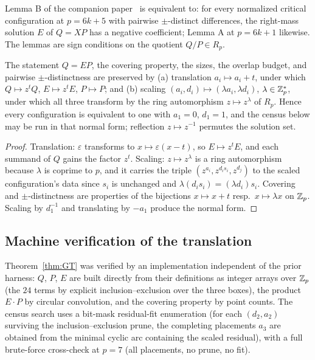\begin{corollary}\label{cor:signform}
Lemma B of the companion paper~\cite{companion-paper} is equivalent to: for every normalized
critical configuration at $p=6k+5$ with pairwise $\pm$-distinct differences,
the right-mass solution $E$ of $Q=XP$ has a negative coefficient; Lemma A at
$p=6k+1$ likewise. The lemmas are sign conditions on the quotient
$Q/P\in R_p$.
\end{corollary}

\begin{proposition}\label{prop:normalform}
The statement $Q=EP$, the covering property, the sizes, the overlap budget,
and pairwise $\pm$-distinctness are preserved by \textup{(a)} translation
$a_i\mapsto a_i+t$, under which $Q\mapsto z^{t}Q$, $E\mapsto z^{t}E$,
$P\mapsto P$; and \textup{(b)} scaling $(a_i,d_i)\mapsto(\lambda a_i,
\lambda d_i)$, $\lambda\in\mathbb{Z}_p^{*}$, under which all three transform by the
ring automorphism $z\mapsto z^{\lambda}$ of $R_p$. Hence every configuration
is equivalent to one with $a_1=0$, $d_1=1$, and the census below may be run
in that normal form; reflection $z\mapsto z^{-1}$ permutes the solution set.
\end{proposition}

\begin{proof}
Translation: $\varepsilon$ transforms to $x\mapsto\varepsilon(x-t)$, so
$E\mapsto z^tE$, and each summand of $Q$ gains the factor $z^t$. Scaling:
$z\mapsto z^\lambda$ is a ring automorphism because $\lambda$ is coprime to
$p$, and it carries the triple $(z^{a_i},z^{d_is_i},z^{d_j})$ to the scaled
configuration's data since $s_i$ is unchanged and
$\lambda(d_is_i)=(\lambda d_i)s_i$. Covering and $\pm$-distinctness are
properties of the bijections $x\mapsto x+t$ resp.\ $x\mapsto\lambda x$ on
$\mathbb{Z}_p$. Scaling by $d_1^{-1}$ and translating by $-a_1$ produce the normal
form.
\end{proof}

\subsection{Machine verification of the translation}\label{sec:gt-verify}

Theorem~\ref{thm:GT} was verified by an implementation independent of the
prior harness: $Q$, $P$, $E$ are built directly from their definitions as
integer arrays over $\mathbb{Z}_p$ (the $24$ terms by explicit inclusion--exclusion
over the three boxes), the product $E\cdot P$ by circular convolution, and
the covering property by point counts. The census search uses a
bit-mask residual-fit enumeration (for each $(d_2,a_2)$ surviving the
inclusion--exclusion prune, the completing placements $a_3$ are obtained
from the minimal cyclic arc containing the scaled residual), with a full
brute-force cross-check at $p=7$ (all placements, no prune, no fit).

